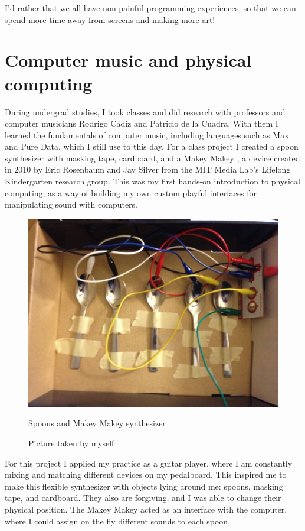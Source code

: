 I'd rather that we all have non-painful programming experiences, so that we can spend more time away from screens and making more art!

\section{Computer music and physical computing}

During undergrad studies, I took classes and did research with professors and computer musicians Rodrigo Cádiz and Patricio de la Cuadra. With them I learned the fundamentals of computer music, including languages such as Max and Pure Data, which I still use to this day. For a class project I created a spoon synthesizer with masking tape, cardboard, and a Makey Makey \cite{website-makey-makey}, a device created in 2010 by Eric Rosenbaum and Jay Silver from the MIT Media Lab's Lifelong Kindergarten research group. This was my first hands-on introduction to physical computing, as a way of building my own custom playful interfaces for manipulating sound with computers.
 
\begin{figure}[ht]
  \centering
  \includegraphics[width=0.75\linewidth,height=0.25\textheight,keepaspectratio]{images/makey-makey-spoons.jpg}
  \caption{Spoons and Makey Makey synthesizer}
  \caption*{Picture taken by myself}
  \label{fig:makey-makey-spoons}
\end{figure}

For this project I applied my practice as a guitar player, where I am constantly mixing and matching different devices on my pedalboard. This inspired me to make this flexible synthesizer with objects lying around me: spoons, masking tape, and cardboard. They also are forgiving, and I was able to change their physical position. The Makey Makey acted as an interface with the computer, where I could assign on the fly different sounds to each spoon.

